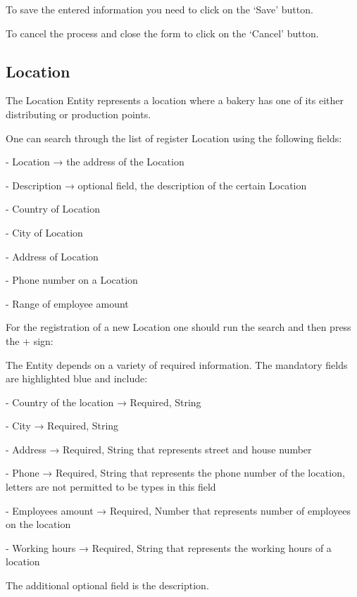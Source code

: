 To save the entered information you need to click on the ‘Save’ button. 

To cancel the process and close the form to click on the ‘Cancel' button.

\subsection{Location}

The Location Entity represents a location where a bakery has one of its either distributing or production points. 

One can search through the list of register Location using the following fields:

- Location → the address of the Location

- Description → optional field, the description of the certain Location 

- Country of Location

- City of Location

- Address of Location

- Phone number on a Location

- Range of employee amount


For the registration of a new Location one should run the search and then press the + sign:


The Entity depends on a variety of required information. The mandatory fields are highlighted blue and include:


- Country of the location → Required, String

- City → Required, String

- Address → Required, String that represents street and house number

- Phone → Required, String that represents the phone number of the location, letters are not permitted to be types in this field

- Employees amount → Required, Number that represents number of employees on the location

- Working hours → Required, String that represents the working hours of a location

The additional optional field is the description.

